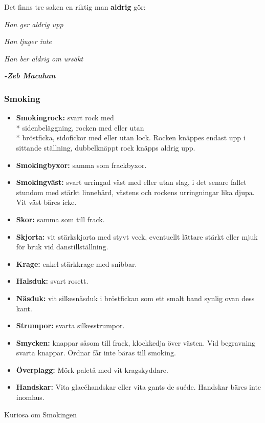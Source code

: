 Det finns tre saken en riktig man \textbf{aldrig} gör:

\textit{Han ger aldrig upp}

\textit{Han ljuger inte}

\textit{Han ber aldrig om ursäkt}

\textit{\textbf{-Zeb Macahan}}

\subsubsection*{\textbf{Smoking}}

\begin{itemize}

    \item[]\textbf{Smokingrock:} svart rock med\\* sidenbeläggning, rocken med eller utan\\* bröstficka, sidofickor med eller utan lock. Rocken knäppes endast upp i sittande ställning, dubbelknäppt rock knäpps aldrig upp.

    \item[]\textbf{Smokingbyxor:} samma som frackbyxor.

    \item[]\textbf{Smokingväst:} svart urringad väst med eller utan slag, i det senare fallet stundom med stärkt linnebård, västens och rockens urringningar lika djupa. Vit väst bäres icke.

    \item[]\textbf{Skor:} samma som till frack.

    \item[]\textbf{Skjorta:} vit stärkskjorta med styvt veck, eventuellt lättare stärkt eller mjuk för bruk vid danstillställning.

    \item[]\textbf{Krage:} enkel stärkkrage med snibbar.

    \item[]\textbf{Halsduk:} svart rosett.

    \item[]\textbf{Näsduk:} vit silkesnäsduk i bröstfickan som ett smalt band synlig ovan dess kant.

    \item[]\textbf{Strumpor:} svarta silkesstrumpor.

    \item[]\textbf{Smycken:} knappar såsom till frack, klockkedja över västen. Vid begravning svarta knappar. Ordnar får inte bäras till smoking.

    \item[]\textbf{Överplagg:} Mörk paletå med vit kragskyddare.

    \item[]\textbf{Handskar:} Vita glacéhandskar eller vita gants de suéde. Handskar bäres inte inomhus.

\end{itemize}
Kuriosa om Smokingen

